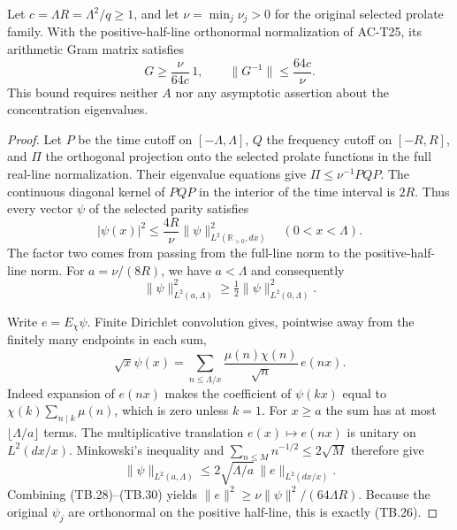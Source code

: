 \begin{proposition}
\label{AC-T27}
Let \(c=\Lambda R=\Lambda^2/q\geq1\), and let
\(\nu=\min_j\nu_j>0\) for the original selected prolate family.
With the positive-half-line orthonormal normalization of
AC-T25, its arithmetic Gram matrix satisfies
\[
       G\geq\frac{\nu}{64c}\,1,\qquad
       \|G^{-1}\|\leq\frac{64c}{\nu}.
 \tag{TB.26}
\]
This bound requires neither \(A\) nor any asymptotic assertion
about the concentration eigenvalues.
\end{proposition}
\begin{proof}
Let \(P\) be the time cutoff on \([-\Lambda,\Lambda]\),
\(Q\) the frequency cutoff on \([-R,R]\), and \(\Pi\) the
orthogonal projection onto the selected prolate functions in
the full real-line normalization.  Their eigenvalue equations
give \(\Pi\leq\nu^{-1}PQP\).  The continuous diagonal kernel
of \(PQP\) in the interior of the time interval is \(2R\).
Thus every vector \(\psi\) of the selected parity satisfies
\[
 |\psi(x)|^2\leq\frac{4R}{\nu}
                     \|\psi\|_{L^2(\mathbb R_{>0},dx)}^2
       \quad(0<x<\Lambda).
 \tag{TB.27}
\]
The factor two comes from passing from the full-line norm to
the positive-half-line norm.  For
\(a=\nu/(8R)\), we have \(a<\Lambda\) and consequently
\[
 \|\psi\|_{L^2(a,\Lambda)}^2
                     \geq\tfrac12\|\psi\|_{L^2(0,\Lambda)}^2.
 \tag{TB.28}
\]

Write \(e=E_\chi\psi\).  Finite Dirichlet convolution gives,
pointwise away from the finitely many endpoints in each sum,
\[
 \sqrt{x}\psi(x)
       =\sum_{n\leq\Lambda/x}
                     \frac{\mu(n)\chi(n)}{\sqrt n}\,e(nx).
 \tag{TB.29}
\]
Indeed expansion of \(e(nx)\) makes the coefficient of
\(\psi(kx)\) equal to
\(\chi(k)\sum_{n\mid k}\mu(n)\), which is zero unless \(k=1\).
For \(x\geq a\) the sum has at most \(\lfloor\Lambda/a\rfloor\)
terms.  The multiplicative translation \(e(x)\mapsto e(nx)\)
is unitary on \(L^2(dx/x)\).  Minkowski's inequality and
\(\sum_{n\leq M}n^{-1/2}\leq2\sqrt M\) therefore give
\[
 \|\psi\|_{L^2(a,\Lambda)}
       \leq2\sqrt{\Lambda/a}\,\|e\|_{L^2(dx/x)}.
 \tag{TB.30}
\]
Combining (TB.28)--(TB.30) yields
\(\|e\|^2\geq\nu\|\psi\|^2/(64\Lambda R)\).
Because the original \(\psi_j\) are orthonormal on the
positive half-line, this is exactly (TB.26).
\end{proof}

